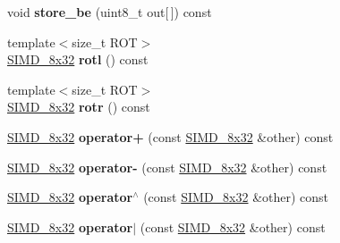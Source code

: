 \begin{DoxyCompactItemize}
\item 
\mbox{\label{class_botan_1_1_s_i_m_d__8x32_ae6e19c3b8c0b2dcc060771445e648d85}} 
void {\bfseries store\+\_\+be} (uint8\+\_\+t out\mbox{[}$\,$\mbox{]}) const
\item 
\mbox{\label{class_botan_1_1_s_i_m_d__8x32_a861951a0d487a4f3fc7dcc1ee18a42d0}} 
{\footnotesize template$<$size\+\_\+t R\+OT$>$ }\\\mbox{\hyperlink{class_botan_1_1_s_i_m_d__8x32}{S\+I\+M\+D\+\_\+8x32}} {\bfseries rotl} () const
\item 
\mbox{\label{class_botan_1_1_s_i_m_d__8x32_ad37dc072de6543f205b64ee7f0739fb6}} 
{\footnotesize template$<$size\+\_\+t R\+OT$>$ }\\\mbox{\hyperlink{class_botan_1_1_s_i_m_d__8x32}{S\+I\+M\+D\+\_\+8x32}} {\bfseries rotr} () const
\item 
\mbox{\label{class_botan_1_1_s_i_m_d__8x32_a5f97d64fdc3023e76ddd0c62115418c5}} 
\mbox{\hyperlink{class_botan_1_1_s_i_m_d__8x32}{S\+I\+M\+D\+\_\+8x32}} {\bfseries operator+} (const \mbox{\hyperlink{class_botan_1_1_s_i_m_d__8x32}{S\+I\+M\+D\+\_\+8x32}} \&other) const
\item 
\mbox{\label{class_botan_1_1_s_i_m_d__8x32_a3573c7f942fc9317297ea8434fa09b01}} 
\mbox{\hyperlink{class_botan_1_1_s_i_m_d__8x32}{S\+I\+M\+D\+\_\+8x32}} {\bfseries operator-\/} (const \mbox{\hyperlink{class_botan_1_1_s_i_m_d__8x32}{S\+I\+M\+D\+\_\+8x32}} \&other) const
\item 
\mbox{\label{class_botan_1_1_s_i_m_d__8x32_a34c5d1c7363d8f3f9aed5072096c6a66}} 
\mbox{\hyperlink{class_botan_1_1_s_i_m_d__8x32}{S\+I\+M\+D\+\_\+8x32}} {\bfseries operator$^\wedge$} (const \mbox{\hyperlink{class_botan_1_1_s_i_m_d__8x32}{S\+I\+M\+D\+\_\+8x32}} \&other) const
\item 
\mbox{\label{class_botan_1_1_s_i_m_d__8x32_ae375c89ab393a3cbde40c813aed966cd}} 
\mbox{\hyperlink{class_botan_1_1_s_i_m_d__8x32}{S\+I\+M\+D\+\_\+8x32}} {\bfseries operator$\vert$} (const \mbox{\hyperlink{class_botan_1_1_s_i_m_d__8x32}{S\+I\+M\+D\+\_\+8x32}} \&other) const

\end{DoxyCompactItemize}
